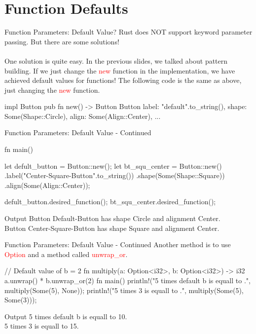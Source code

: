 \documentclass[10pt,xcolor={dvipsnames}, aspectratio=169]{beamer}
\begin{document}
\section{Function Defaults}
\begin{frame}[fragile]{Function Parameters: Default Value?}
	    Rust does NOT support keyword parameter passing. But there are some solutions! \\ \\
	    One solution is quite easy. In the previous slides, we talked about pattern building. If we just change the \textcolor{red}{new} function in the implementation, we have achieved default values for functions!
	        The following code is the same as above, just changing the \textcolor{red}{new} function. \\
	   \begin{rustcode}
impl Button {
    pub fn new() -> Button { 
        Button {
            label: "default".to_string(),
            shape: Some(Shape::Circle),
            align: Some(Align::Center),
        }
    }
    ...
}
        \end{rustcode}
\end{frame}
\begin{frame}[fragile]{Function Parameters: Default Value - Continued}
	        \begin{rustcode}
fn main() {
    let defult_button = Button::new();
    let bt_squ_center = Button::new()
        .label("Center-Square-Button".to_string())
        .shape(Some(Shape::Square))
        .align(Some(Align::Center));

    defult_button.desired_function();
    bt_squ_center.desired_function();
}
        \end{rustcode}
\begin{block}{Output}
Button Default-Button has shape Circle and alignment Center. \\
Button Center-Square-Button has shape Square and alignment Center.
\end{block}
\end{frame}

\begin{frame}[fragile]{Function Parameters: Default Value - Continued}
	    Another method is to use \textcolor{red}{Option} and a method called \textcolor{red}{unwrap\_or}.
	   \begin{rustcode}
// Default value of b = 2
fn multiply(a: Option<i32>, b: Option<i32>) -> i32 {
    a.unwrap() * b.unwrap_or(2)
}
fn main() {
    println!("5 times default b is equall to {}.", multiply(Some(5), None));
    println!("5 times 3 is equall to {}.", multiply(Some(5), Some(3)));
}
        \end{rustcode}
\begin{block}{Output}
5 times default b is equall to 10. \\
5 times 3 is equall to 15.
\end{block}
\end{frame}
\end{document}
